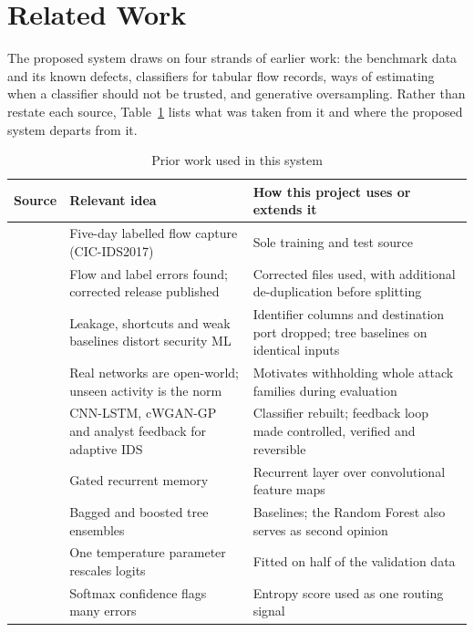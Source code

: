 \documentclass[conference]{IEEEtran}
\begin{document}
\section{Related Work}
The proposed system draws on four strands of earlier work: the benchmark data and its known defects,
classifiers for tabular flow records, ways of estimating when a classifier should not be
trusted, and generative oversampling. Rather than restate each source, Table~\ref{tab:related}
lists what was taken from it and where the proposed system departs from it.

\begin{table}[t]
\caption{Prior work used in this system}
\label{tab:related}
\centering
\footnotesize
\begin{tabular}{p{1.6cm}p{6.9cm}p{8.35cm}}
\toprule
Source & Relevant idea & How this project uses or extends it \\
\midrule
\cite{sharafaldin2018toward} & Five-day labelled flow capture (CIC-IDS2017) & Sole training and test source \\
\cite{engelen2021troubleshooting,liu2022error} & Flow and label errors found; corrected release published & Corrected files used, with additional de-duplication before splitting \\
\cite{arp2022dos} & Leakage, shortcuts and weak baselines distort security ML & Identifier columns and destination port dropped; tree baselines on identical inputs \\
\cite{sommer2010outside} & Real networks are open-world; unseen activity is the norm & Motivates withholding whole attack families during evaluation \\
\cite{refpaper2025} & CNN-LSTM, cWGAN-GP and analyst feedback for adaptive IDS & Classifier rebuilt; feedback loop made controlled, verified and reversible \\
\cite{hochreiter1997lstm} & Gated recurrent memory & Recurrent layer over convolutional feature maps \\
\cite{breiman2001random,ke2017lightgbm} & Bagged and boosted tree ensembles & Baselines; the Random Forest also serves as second opinion \\
\cite{guo2017calibration} & One temperature parameter rescales logits & Fitted on half of the validation data \\
\cite{hendrycks2017baseline} & Softmax confidence flags many errors & Entropy score used as one routing signal \\

\end{tabular}
\end{table}
\end{document}
